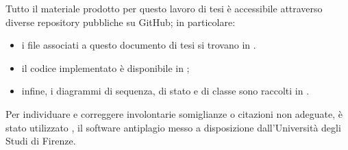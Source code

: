 \medskip

Tutto il materiale prodotto per questo lavoro di tesi è accessibile attraverso diverse repository pubbliche su GitHub; in particolare:

\begin{itemize}

\item i file \latex associati a questo documento di tesi si trovano in \myThesisRepo.

\item il codice implementato è disponibile in \myCodeRepo;

\item infine, i diagrammi di sequenza, di stato e di classe sono raccolti in \myDiagramsRepo.

\end{itemize}

Per individuare e correggere involontarie somiglianze o citazioni non adeguate, è stato utilizzato \myAntiplagio, il software antiplagio messo a disposizione dall'Università degli Studi di Firenze.
